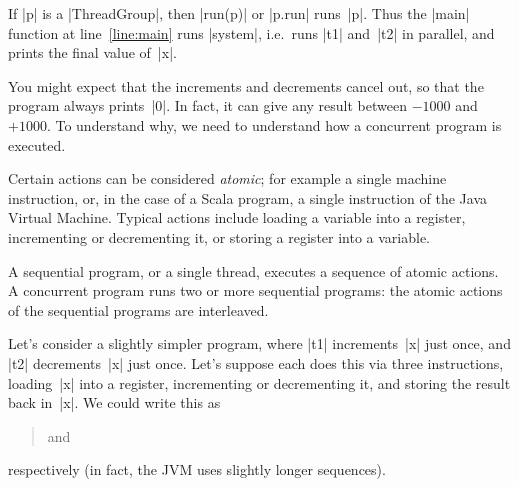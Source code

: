 If |p| is a |ThreadGroup|, then |run(p)| or |p.run| runs~|p|.  Thus the |main|
function at line~\ref{line:main} runs |system|, i.e.~runs |t1| and~|t2| in
parallel, and prints the final value of~|x|.

You might expect that the increments and decrements cancel out, so that the
program always prints~|0|.  In fact, it can give any result between $-1000$
and $+1000$.
%
To understand why, we need to understand how a concurrent program is
executed. 
 
Certain actions can be considered \emph{atomic}; for example a single machine
instruction, or, in the case of a Scala program, a single instruction of the
Java Virtual Machine.  Typical actions include loading a variable into a
register, incrementing or decrementing it, or storing a register into a
variable. 

A sequential program, or a single thread, executes a sequence of atomic
actions.  
%
A concurrent program runs two or more sequential programs: the atomic actions
of the sequential programs are interleaved.

Let's consider a slightly simpler program, where |t1| increments~|x| just
once, and |t2| decrements~|x| just once.  Let's suppose each does this via three
instructions, loading~|x| into a register, incrementing or decrementing it,
and storing the result back in~|x|.  We could write this as
\begin{quote}
 \qquad and \qquad {}
\end{quote}
respectively (in fact, the JVM uses slightly longer sequences).

